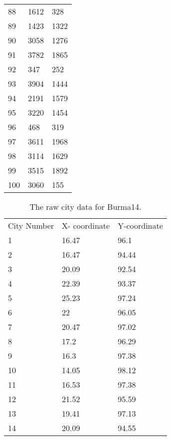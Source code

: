\begin{longtable}[c]{ p{} p{} p{} }
	88          & 1612          & 328          \\
	89          & 1423          & 1322         \\
	90          & 3058          & 1276         \\
	91          & 3782          & 1865         \\
	92          & 347           & 252          \\
	93          & 3904          & 1444         \\
	94          & 2191          & 1579         \\
	95          & 3220          & 1454         \\
	96          & 468           & 319          \\
	97          & 3611          & 1968         \\
	98          & 3114          & 1629         \\
	99          & 3515          & 1892         \\
	100         & 3060          & 155      \\
\end{longtable} \pagebreak

\begin{table}[H]
	\caption{The  raw city data for Burma14.}
	\label{table:Burma14Data}
	\begin{center}
		\begin{tabular}{lll}
			City Number & X- coordinate & Y-coordinate \\
			1           & 16.47         & 96.1         \\
			2           & 16.47         & 94.44        \\
			3           & 20.09         & 92.54        \\
			4           & 22.39         & 93.37        \\
			5           & 25.23         & 97.24        \\
			6           & 22            & 96.05        \\
			7           & 20.47         & 97.02        \\
			8           & 17.2          & 96.29        \\
			9           & 16.3          & 97.38        \\
			10          & 14.05         & 98.12        \\
			11          & 16.53         & 97.38        \\
			12          & 21.52         & 95.59        \\
			13          & 19.41         & 97.13        \\
			14          & 20.09         & 94.55       
		\end{tabular}
	\end{center}
\end{table}